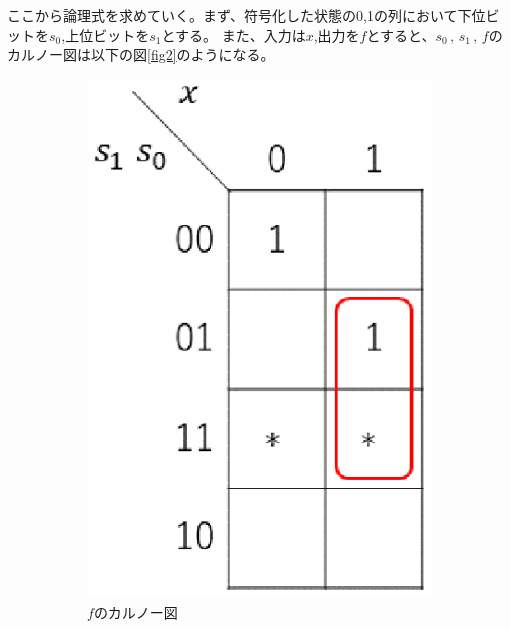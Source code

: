 \documentclass{jsarticle}
\begin{document}
\begin{description}
\begin{description}
            ここから論理式を求めていく。まず、符号化した状態の0,1の列において下位ビットを$s_0$,上位ビットを$s_1$とする。
            また、入力は$x$,出力を$f$とすると、$s_0 \,,\, s_1 \,,\, f$のカルノー図は以下の図\ref{fig2}のようになる。
            \begin{figure}[H]
                \centering
                \begin{subfigure}{0.2\columnwidth}
                    \centering
                    \includegraphics[width=\columnwidth]{fig_2_f.eps}
                    \caption{$f$のカルノー図}
                    \label{fig2_f}
                \end{subfigure}
                \begin{subfigure}{0.2\columnwidth}
                    \centering

\end{subfigure}
\end{figure}
\end{description}
\end{description}
\end{document}
